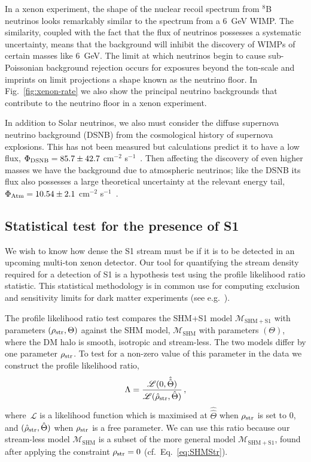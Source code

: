 \documentclass[prd,10pt,twocolumn,showpacs,nofootinbib,aps,superscriptaddress,preprintnumbers]{revtex4-1}
\begin{document}
In a xenon experiment, the shape of the nuclear recoil spectrum from $^8$B neutrinos
 looks remarkably
similar to the spectrum from a 6~GeV WIMP. The similarity, coupled with the fact that the
flux of neutrinos possesses a systematic uncertainty, means that the
background will inhibit the discovery of WIMPs of certain masses like
6~GeV. The limit at which neutrinos begin to cause sub-Poissonian
background rejection occurs for exposures beyond the ton-scale and
imprints on limit projections a shape known as the neutrino floor. In 
Fig.~\ref{fig:xenon-rate} we also show the principal neutrino backgrounds 
that contribute to the neutrino floor in a xenon experiment.

In addition to Solar neutrinos, we also must consider the diffuse
supernova neutrino background (DSNB) from the cosmological history 
of supernova explosions. This has not been measured but calculations predict it to have a low flux,
$\Phi_{\rm DSNB} = 85.7 \pm 42.7$ cm$^{-2}$
s$^{-1}$~\cite{Beacom:2010kk}. Then affecting the discovery of even higher masses
we have the background due to atmospheric neutrinos; like the DSNB its
flux also possesses a large theoretical uncertainty at the relevant
energy tail, $\Phi_{\rm Atm} = 10.54 \pm 2.1$ cm$^{-2}$
s$^{-1}$~\cite{Honda:2011nf}.


\subsection{Statistical test for the presence of S1}

We wish to know how dense the S1 stream must be if it is to be detected in 
an upcoming multi-ton xenon detector. Our tool for quantifying the stream density
required for a detection of S1 is a hypothesis test using the profile likelihood ratio statistic.
This statistical methodology is in
common use for computing exclusion and sensitivity limits for dark
matter experiments (see e.g.~\cite{Billard:2013gfa,Edwards:2017mnf}).

The profile likelihood ratio test compares the SHM+S1 model
$\mathcal{M}_{\mathrm{SHM}+\mathrm{S1}}$
with parameters $(\rho_{\rm str},\Theta)$ against the SHM model, $\mathcal{M}_{\mathrm{SHM}}$ with parameters $(\Theta)$,
where the DM halo is smooth, isotropic and stream-less. 
The two models differ by one parameter $\rho_{\rm str}$. To test for a non-zero value of this parameter in the data we construct the profile likelihood ratio,
%
\begin{equation}\label{eq:likelihood-ratio}
\Lambda = \frac{ \mathscr{L} (0,\hat{\hat{\Theta}} ) }{\mathscr{L} (\hat{\rho}_{\rm str},\hat{\Theta} )  }\, ,
\end{equation}
%
where~$\mathscr{L}$ is a likelihood function which is maximised at
$\hat{\hat{\Theta}}$ when $\rho_{\rm str}$ is set to 0, and $(\hat{\rho}_{\rm str},\hat{\Theta})$ when $\rho_{\rm str}$ is a free parameter. We can use this ratio because our stream-less model
$\mathcal{M}_{\mathrm{SHM}}$ is a subset of the more general model
$\mathcal{M}_{\mathrm{SHM}+\mathrm{S1}}$, found after applying the constraint $\rho_{\rm str} = 0$ (cf.~Eq.~\eqref{eq:SHMStr}).
\end{document}
